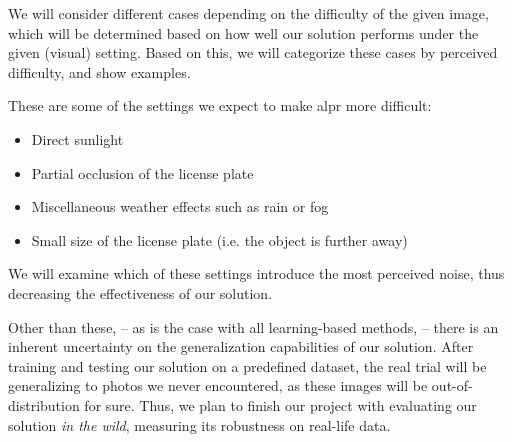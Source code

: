 We will consider different cases depending on the difficulty of the given image,
which will be determined based on how well our solution performs under
the given (visual) setting. Based on this, we will categorize these cases by
perceived difficulty, and show examples.

These are some of the settings we expect to make \ac{alpr} more difficult:
\begin{itemize}
    \item Direct sunlight 
    \item Partial occlusion of the license plate 
    \item Miscellaneous weather effects such as rain or fog
    \item Small size of the license plate (i.e. the object is further away)
\end{itemize}

We will examine which of these settings introduce the most perceived noise, thus
decreasing the effectiveness of our solution.

Other than these, -- as is the case with all learning-based methods, -- there is
an inherent uncertainty on the generalization capabilities of our solution.
After training and testing our solution on a predefined dataset, the real trial
will be generalizing to photos we never encountered, as these images will be
out-of-distribution for sure. Thus, we plan to finish our project with
evaluating our solution \textit{in the wild}, measuring its robustness on
real-life data.
